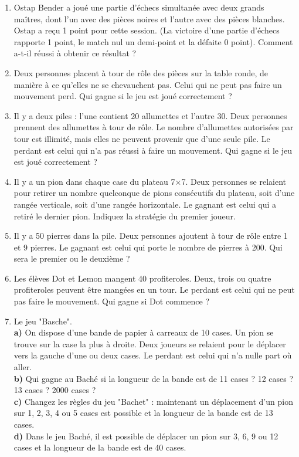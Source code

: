 \documentclass{article}
\begin{document}
\begin{enumerate}
    \item Ostap Bender a joué une partie d'échecs simultanée avec deux grands maîtres, dont l'un avec des pièces noires et l'autre avec des pièces blanches. Ostap a reçu 1 point pour cette session. (La victoire d'une partie d'échecs rapporte 1 point, le match nul un demi-point et la défaite 0 point). Comment a-t-il réussi à obtenir ce résultat ?
    \item Deux personnes placent à tour de rôle des pièces sur la table ronde, de manière à ce qu'elles ne se chevauchent pas. Celui qui ne peut pas faire un mouvement perd. Qui gagne si le jeu est joué correctement ?
    \item Il y a deux piles : l'une contient 20 allumettes et l'autre 30. Deux personnes prennent des allumettes à tour de rôle. Le nombre d'allumettes autorisées par tour est illimité, mais elles ne peuvent provenir que d'une seule pile. Le perdant est celui qui n'a pas réussi à faire un mouvement. Qui gagne si le jeu est joué correctement ?
    \item Il y a un pion dans chaque case du plateau 7×7. Deux personnes se relaient pour retirer un nombre quelconque de pions consécutifs du plateau, soit d'une rangée verticale, soit d'une rangée horizontale. Le gagnant est celui qui a retiré le dernier pion. Indiquez la stratégie du premier joueur.
    \item Il y a 50 pierres dans la pile. Deux personnes ajoutent à tour de rôle entre 1 et 9 pierres. Le gagnant est celui qui porte le nombre de pierres à 200. Qui sera le premier ou le deuxième ?
	\item Les élèves Dot et Lemon mangent 40 profiteroles. Deux, trois ou quatre profiteroles peuvent être mangées en un tour. Le perdant est celui qui ne peut pas faire le mouvement. Qui gagne si Dot commence ?
	\item Le jeu "Basche".\\
		\textbf{a)} On dispose d'une bande de papier à carreaux de 10 cases. Un pion se trouve sur la case la plus à droite. Deux joueurs se relaient pour le déplacer vers la gauche d'une ou deux cases. Le perdant est celui qui n'a nulle part où aller.\\
		\textbf{b)} Qui gagne au Baché si la longueur de la bande est de 11 cases ? 12 cases ? 13 cases ? 2000 cases ?\\
		\textbf{c)} Changez les règles du jeu "Bachet" : maintenant un déplacement d'un pion sur 1, 2, 3, 4 ou 5 cases est possible et la longueur de la bande est de 13 cases.\\
		\textbf{d)} Dans le jeu Baché, il est possible de déplacer un pion sur 3, 6, 9 ou 12 cases et la longueur de la bande est de 40 cases.\\
\end{enumerate}
\end{document}
